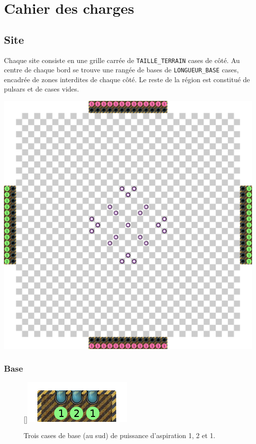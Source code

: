 \section{Cahier des charges}\label{cahier-des-charges}

\subsection{Site}\label{site}

Chaque site consiste en une grille carrée de \texttt{TAILLE\_TERRAIN}
cases de côté. Au centre de chaque bord se trouve une rangée de bases de
\texttt{LONGUEUR\_BASE} cases, encadrée de zones interdites de chaque
côté. Le reste de la région est constitué de pulsars et de cases vides.

\noindent\includegraphics[width=\textwidth]{asset/site.png}

\newpage
\subsubsection{Base}\label{base}

\begin{figure}
    \centering
    \raisebox{0pt}[\dimexpr{}\baselineskip\relax]{\includegraphics{asset/base.png}}
    \caption*{Trois cases de base (au sud) de puissance d'aspiration 1, 2 et 1.}
\end{figure}

